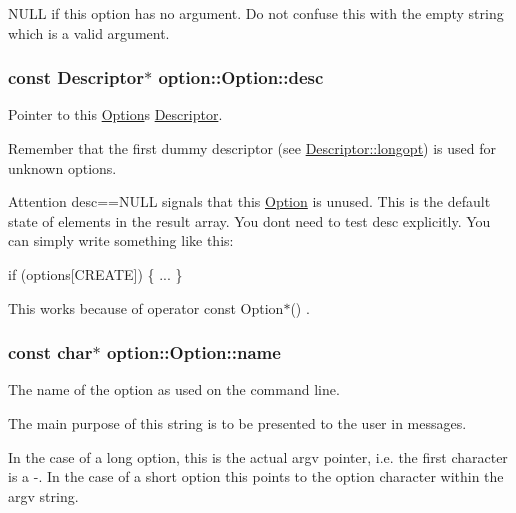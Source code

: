 N\+U\+LL if this option has no argument. Do not confuse this with the empty string which is a valid argument. 
\subsubsection[{\texorpdfstring{desc}{desc}}]{\setlength{\rightskip}{0pt plus 5cm}const {\bf Descriptor}$\ast$ option\+::\+Option\+::desc}\hypertarget{classoption_1_1Option_af8d664a7b5de1425008b1812a90a0c23}{}\label{classoption_1_1Option_af8d664a7b5de1425008b1812a90a0c23}


Pointer to this \hyperlink{classoption_1_1Option}{Option}\textquotesingle{}s \hyperlink{structoption_1_1Descriptor}{Descriptor}. 

Remember that the first dummy descriptor (see \hyperlink{structoption_1_1Descriptor_a470c449dfa894c9bfda2dae026142b4b}{Descriptor\+::longopt}) is used for unknown options.

\begin{DoxyAttention}{Attention}
{\ttfamily desc==N\+U\+LL} signals that this \hyperlink{classoption_1_1Option}{Option} is unused. This is the default state of elements in the result array. You don\textquotesingle{}t need to test {\ttfamily desc} explicitly. You can simply write something like this\+: 
\begin{DoxyCode}
\textcolor{keywordflow}{if} (options[CREATE])
\{
  ...
\}
\end{DoxyCode}
 This works because of {\ttfamily  operator const Option$\ast$() }. 
\end{DoxyAttention}
\subsubsection[{\texorpdfstring{name}{name}}]{\setlength{\rightskip}{0pt plus 5cm}const char$\ast$ option\+::\+Option\+::name}\hypertarget{classoption_1_1Option_a02a76b4896abd22d0ba8514362261de9}{}\label{classoption_1_1Option_a02a76b4896abd22d0ba8514362261de9}


The name of the option as used on the command line. 

The main purpose of this string is to be presented to the user in messages.

In the case of a long option, this is the actual {\ttfamily argv} pointer, i.\+e. the first character is a \textquotesingle{}-\/\textquotesingle{}. In the case of a short option this points to the option character within the {\ttfamily argv} string.

